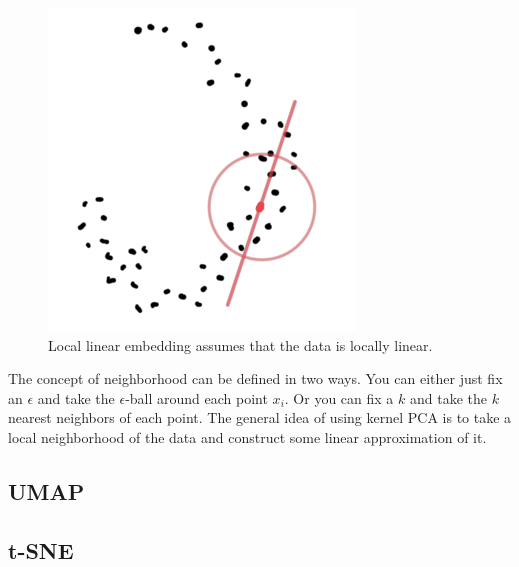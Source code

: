     \begin{figure}[H]
      \centering 
      \includegraphics[scale=0.4]{img/local_linear_embedding.png}
      \caption{Local linear embedding assumes that the data is locally linear. } 
      \label{fig:local_linear_embedding}
    \end{figure}

    The concept of neighborhood can be defined in two ways. You can either just fix an $\epsilon$ and take the $\epsilon$-ball around each point $x_i$. Or you can fix a $k$ and take the $k$ nearest neighbors of each point. The general idea of using kernel PCA is to take a local neighborhood of the data and construct some linear approximation of it. 

  \subsection{UMAP}

  \subsection{t-SNE}

